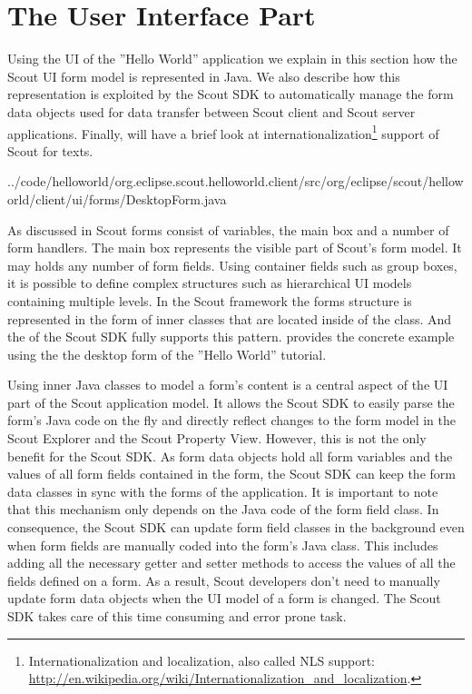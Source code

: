 \documentclass[a4paper,10pt,twoside]{book}
\begin{document}
\section{The User Interface Part}

Using the UI of the ''Hello World'' application we explain in this section how the Scout UI form model is represented in Java. 
We also describe how this representation is exploited by the Scout SDK to automatically manage the form data objects used for data transfer between Scout client and Scout server applications.
Finally, will have a brief look at internationalization\footnote{
Internationalization and localization, also called NLS support: \url{http://en.wikipedia.org/wiki/Internationalization_and_localization}.
} 
support of Scout for texts.


{../code/helloworld/org.eclipse.scout.helloworld.client/src/org/eclipse/scout/helloworld/client/ui/forms/DesktopForm.java}

As discussed in  Scout forms consist of variables, the main box and a number of form handlers.
The main box represents the visible part of Scout's form model.
It may holds any number of form fields.
Using container fields such as group boxes, it is possible to define complex structures such as hierarchical UI models containing multiple levels.
In the Scout framework the forms structure is represented in the form of inner classes that are located inside of the  class.
And the  of the Scout SDK fully supports this pattern.
 provides the concrete example using the the desktop form of the ''Hello World'' tutorial.

Using inner Java classes to model a form's content is a central aspect of the UI part of the Scout application model.
It allows the Scout SDK to easily parse the form's Java code on the fly and directly reflect changes to the form model in the Scout Explorer and the Scout Property View.
However, this is not the only benefit for the Scout SDK.
As form data objects hold all form variables and the values of all form fields contained in the form, the Scout SDK can keep the form data classes in sync with the forms of the application.
It is important to note that this mechanism only depends on the Java code of the form field class.
In consequence, the Scout SDK can update form field classes in the background even when form fields are manually coded into the form's Java class.
This includes adding all the necessary getter and setter methods to access the values of all the fields defined on a form.
As a result, Scout developers don't need to manually update form data objects when the UI model of a form is changed.
The Scout SDK takes care of this time consuming and error prone task.
\end{document}
